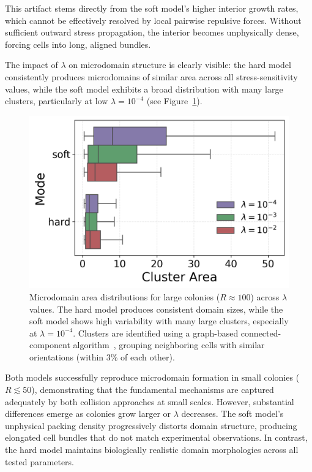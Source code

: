 \documentclass[conference]{IEEEtran}
\begin{document}
This artifact stems directly from the soft model's higher interior growth rates, which cannot be effectively resolved by local pairwise repulsive forces. Without sufficient outward stress propagation, the interior becomes unphysically dense, forcing cells into long, aligned bundles.

The impact of $\lambda$ on microdomain structure is clearly visible: the hard model consistently produces microdomains of similar area across all stress-sensitivity values, while the soft model exhibits a broad distribution with many large clusters, particularly at low $\lambda = 10^{-4}$ (see Figure~\ref{fig:cluster_area_boxplot}).

\begin{figure}[h]
    \centering
    \includegraphics[width=\linewidth]{figures/comparison_plots/cluster_area_boxplot.png}
    \caption{Microdomain area distributions for large colonies ($R \approx 100$) across $\lambda$ values. The hard model produces consistent domain sizes, while the soft model shows high variability with many large clusters, especially at $\lambda = 10^{-4}$. Clusters are identified using a graph-based connected-component algorithm~\cite{You2018}, grouping neighboring cells with similar orientations (within 3\% of each other).}
    \label{fig:cluster_area_boxplot}
\end{figure}

Both models successfully reproduce microdomain formation in small colonies ($R \lesssim 50$), demonstrating that the fundamental mechanisms are captured adequately by both collision approaches at small scales. However, substantial differences emerge as colonies grow larger or $\lambda$ decreases. The soft model's unphysical packing density progressively distorts domain structure, producing elongated cell bundles that do not match experimental observations. In contrast, the hard model maintains biologically realistic domain morphologies across all tested parameters.
\end{document}
